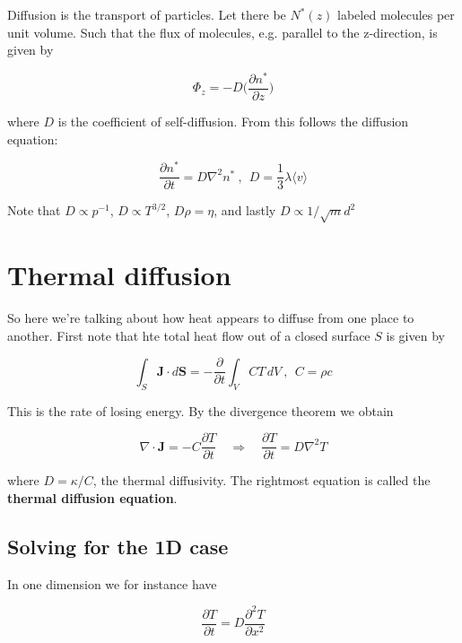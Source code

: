 \documentclass[a4paper]{article}
\begin{document}
Diffusion is the transport of particles. Let there be $N^*(z)$ labeled molecules per unit volume. Such that the flux of molecules, e.g. parallel to the z-direction, is given by

\begin{equation}
	\Phi_z=-D\bigg(\frac{\partial n^*}{\partial z}\bigg)
\end{equation}

where $D$ is the coefficient of self-diffusion. From this follows the diffusion equation:

\begin{equation}
	\frac{\partial n^*}{\partial t}=D\nabla^2n^*\ ,\ \ D=\frac{1}{3}\lambda\langle v\rangle 
\end{equation}

Note that $D\propto p^{-1}$, $D\propto T^{3/2}$, $D\rho=\eta$, and lastly $D\propto 1/\sqrt{m}d^2$

\section{Thermal diffusion}

So here we're talking about how heat appears to diffuse from one place to another. First note that hte total heat flow out of a closed surface $S$ is given by

\begin{equation}
	\int_S\bm{J}\cdot d\bm{S}=-\frac{\partial}{\partial t}\int_V CT\,dV\ , \ \ C=\rho c
\end{equation}

This is the rate of losing energy. By the divergence theorem we obtain

\begin{equation}
	\nabla\cdot\bm{J}=-C\frac{\partial T}{\partial t}\quad\Rightarrow\quad\frac{\partial T}{\partial t}=D\nabla^2 T
\end{equation}

where $D=\kappa/C$, the thermal diffusivity. The rightmost equation is called the \textbf{thermal diffusion equation}.

\subsection{Solving for the 1D case}

In one dimension we for instance have 

\begin{equation}
	\frac{\partial T}{\partial t}=D\frac{\partial^2 T}{\partial x^2}
\end{equation}
\end{document}
